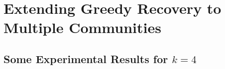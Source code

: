 \chapter{Extending Greedy Recovery to Multiple Communities}
\section{Some Experimental Results for $k=4$}